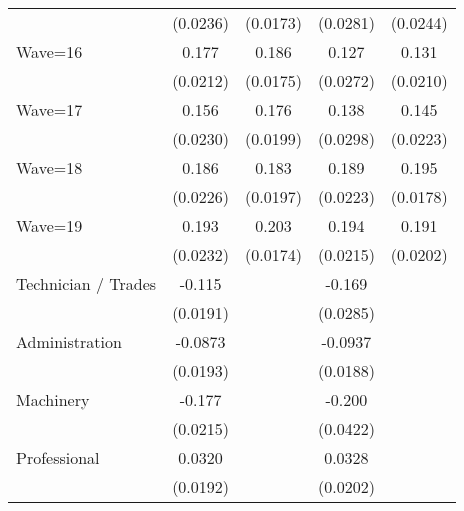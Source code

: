 {\begin{tabular}{l*{4}{c}}
                    &    (0.0236)         &    (0.0173)         &    (0.0281)         &    (0.0244)         \\
[1em]
Wave=16             &       0.177\sym{***}&       0.186\sym{***}&       0.127\sym{***}&       0.131\sym{***}\\
                    &    (0.0212)         &    (0.0175)         &    (0.0272)         &    (0.0210)         \\
[1em]
Wave=17             &       0.156\sym{***}&       0.176\sym{***}&       0.138\sym{***}&       0.145\sym{***}\\
                    &    (0.0230)         &    (0.0199)         &    (0.0298)         &    (0.0223)         \\
[1em]
Wave=18             &       0.186\sym{***}&       0.183\sym{***}&       0.189\sym{***}&       0.195\sym{***}\\
                    &    (0.0226)         &    (0.0197)         &    (0.0223)         &    (0.0178)         \\
[1em]
Wave=19             &       0.193\sym{***}&       0.203\sym{***}&       0.194\sym{***}&       0.191\sym{***}\\
                    &    (0.0232)         &    (0.0174)         &    (0.0215)         &    (0.0202)         \\
[1em]
Technician / Trades &      -0.115\sym{***}&                     &      -0.169\sym{***}&                     \\
                    &    (0.0191)         &                     &    (0.0285)         &                     \\
[1em]
Administration      &     -0.0873\sym{***}&                     &     -0.0937\sym{***}&                     \\
                    &    (0.0193)         &                     &    (0.0188)         &                     \\
[1em]
Machinery           &      -0.177\sym{***}&                     &      -0.200\sym{***}&                     \\
                    &    (0.0215)         &                     &    (0.0422)         &                     \\
[1em]
Professional        &      0.0320         &                     &      0.0328         &                     \\
                    &    (0.0192)         &                     &    (0.0202)         &                     \\

\end{tabular}}
